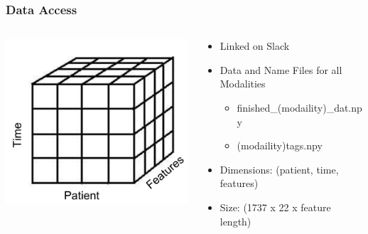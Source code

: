 \documentclass{beamer}
\begin{document}
    \begin{frame}
        \frametitle{Data Access}
        \begin{columns}
        \begin{column}{0.4\textwidth}
            \includegraphics[width=\textwidth]{images/cube.png}
        \end{column}
        \begin{column}{0.6\textwidth}
            \begin{itemize}
                \item Linked on Slack
                \item Data and Name Files for all Modalities
                    \begin{itemize}
                        \item finished\_(modaility)\_dat.npy
                        \item (modaility)tags.npy
                    \end{itemize}
                \item Dimensions: (patient, time, features)
                \item Size: (1737 x 22 x feature length)
            \end{itemize}
        \end{column}
        \end{columns}
    \end{frame}
\end{document}
